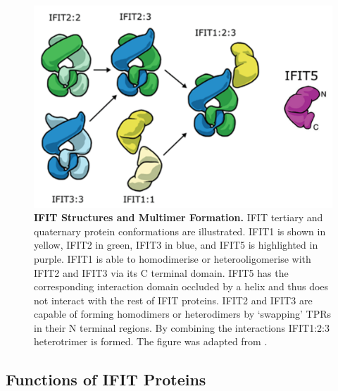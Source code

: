 \begin{figure}
    \centering
    \includegraphics[width=0.75\linewidth]{04. Introduction//Figs/05. IFIT-complexes.png}
    \caption[IFIT Structures and Multimer Formation.]{\textbf{IFIT Structures and Multimer Formation.} IFIT tertiary and quaternary protein conformations are illustrated. IFIT1 is shown in yellow, IFIT2 in green, IFIT3 in blue, and IFIT5 is highlighted in purple. IFIT1 is able to homodimerise or heterooligomerise with IFIT2 and IFIT3 via its C terminal domain. IFIT5 has the corresponding interaction domain occluded by a helix and thus does not interact with the rest of IFIT proteins. IFIT2 and IFIT3 are capable of forming homodimers or heterodimers by ‘swapping’ TPRs in their N terminal regions. By combining the interactions IFIT1:2:3 heterotrimer is formed. The figure was adapted from \cite{Mears2018BetterResponse}.}
    \label{fig:IFIT Structures and Multimer Formation.}
\end{figure}

\subsection{Functions of IFIT Proteins} \label{subsec:Functions of IFIT Proteins}
